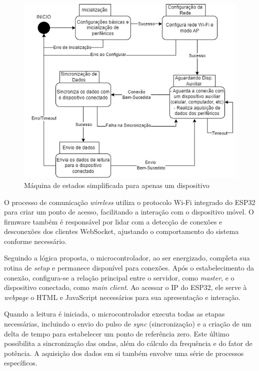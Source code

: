 \begin{figure}[htb!]
    \caption{Máquina de estados simplificada para apenas um dispositivo}
    \label{fig:maq-estado-simp}
    \includegraphics[width=1.0\textwidth]{figuras/Maquina-Estados-Simplificada.jpg}
    \fonte{}
\end{figure}

O processo de comunicação \textit{wireless} utiliza o protocolo Wi-Fi integrado do ESP32 para criar um ponto de acesso, facilitando a interação com o dispositivo móvel. O firmware também é responsável por lidar com a detecção de conexões e desconexões dos clientes WebSocket, ajustando o comportamento do sistema conforme necessário.

Seguindo a lógica proposta, o microcontrolador, ao ser energizado, completa sua rotina de \textit{setup} e permanece disponível para conexões. Após o estabelecimento da conexão, configura-se a relação principal entre o servidor, como \textit{master}, e o dispositivo conectado, como \textit{main client}. Ao acessar o IP do ESP32, ele serve à \textit{webpage} o HTML e JavaScript necessários para sua apresentação e interação.

Quando a leitura é iniciada, o microcontrolador executa todas as etapas necessárias, incluindo o envio do pulso de \textit{sync} (sincronização) e a criação de um delta de tempo para estabelecer um ponto de referência zero. Este último possibilita a sincronização das ondas, além do cálculo da frequência e do fator de potência. A aquisição dos dados em si também envolve uma série de processos específicos.

